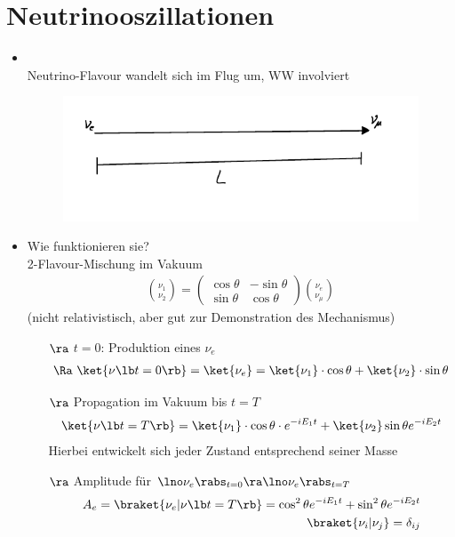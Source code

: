 \section{Neutrinooszillationen}
\begin{itemize}
\item {}\\
Neutrino-Flavour wandelt sich \glqq im Flug\grqq{} um,  WW involviert
\begin{figure}[!ht]
\centering
\includegraphics[width=.5\textwidth]{imgs/ep5-fig-9-3.pdf}
\end{figure}
\item Wie funktionieren sie?\\
 2-Flavour-Mischung im Vakuum
\begin{align}
\binom{\nu_1}{\nu_2} = \begin{pmatrix}
\cos \theta & - \sin \theta \\ \sin \theta & \cos \theta
\end{pmatrix}\binom{\nu_e}{\nu_\mu}
\end{align}
(nicht relativistisch, aber gut zur Demonstration des Mechanismus)
\begin{itemize}
\item[$\ra$] $t=0$: Produktion eines $\nu_e$
\begin{align}
\Ra \ \ket{\nu \lb t=0\rb } = \ket{\nu_e} = \ket{\nu_1} \cdot \cos \theta + \ket{\nu_2} \cdot \sin \theta
\end{align}
\item[$\ra$] Propagation im Vakuum bis $t=T$
\begin{align}
\ket{\nu\lb t=T\rb } = \ket{\nu_1} \cdot \cos \theta \cdot e^{-iE_1t} + \ket{\nu_2} \sin \theta e^{-iE_2t}
\end{align}
Hierbei entwickelt sich jeder Zustand entsprechend seiner Masse
\item[$\ra$] Amplitude für $\lno \nu_e \rabs_{t=0} \ra \lno \nu_e\rabs_{t=T}$
\begin{align}
A_e = \braket{\nu_e | \nu\lb t=T\rb } = \cos^2 \theta e^{-iE_1t} + \sin^2 \theta e^{-iE_2t}\\
\braket{\nu_i|\nu_j} = \delta_{ij} \nonumber

\end{align}
\end{itemize}
\end{itemize}
